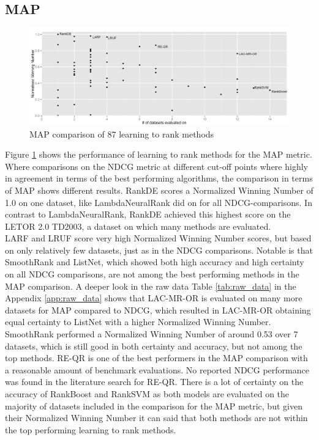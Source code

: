 \documentclass{sig-alternate}
\begin{document}
\subsection{MAP}
\begin{figure}
\includegraphics[scale=0.371]{gfx/map_winnum}
\caption{MAP comparison of 87 learning to rank methods}
\label{fig:normalized_winning_number_map}
\end{figure}
Figure \ref{fig:normalized_winning_number_map} shows the performance of learning to rank methods for the MAP metric. Where comparisons on the NDCG metric at different cut-off points where highly in agreement in terms of the best performing algorithms, the comparison in terms of MAP shows different results. RankDE scores a Normalized Winning Number of 1.0 on one dataset, like LambdaNeuralRank did on for all NDCG-comparisons. In contrast to LambdaNeuralRank, RankDE achieved this highest score on the LETOR 2.0 TD2003, a dataset on which many methods are evaluated.\\

LARF and LRUF score very high Normalized Winning Number scores, but based on only relatively few datasets, just as in the NDCG comparisons. Notable is that SmoothRank and ListNet, which showed both high accuracy and high certainty on all NDCG comparisons, are not among the best performing methods in the MAP comparison. A deeper look in the raw data Table \ref{tab:raw_data} in the Appendix \ref{app:raw_data} shows that LAC-MR-OR is evaluated on many more datasets for MAP compared to NDCG, which resulted in LAC-MR-OR obtaining equal certainty to ListNet with a higher Normalized Winning Number. SmoothRank performed a Normalized Winning Number of around 0.53 over 7 datasets, which is still good in both certainty and accuracy, but not among the top methods. RE-QR is one of the best performers in the MAP comparison with a reasonable amount of benchmark evaluations. No reported NDCG performance was found in the literature search for RE-QR. There is a lot of certainty on the accuracy of RankBoost and RankSVM as both models are evaluated on the majority of datasets included in the comparison for the MAP metric, but given their Normalized Winning Number it can said that both methods are not within the top performing learning to rank methods.
\end{document}

